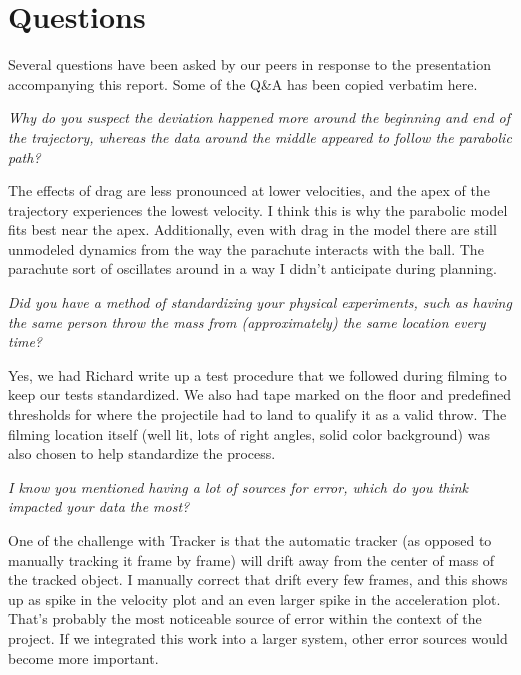 \section{Questions}

Several questions have been asked by our peers in response to the presentation accompanying this report. Some of the Q\&A has been copied verbatim here.

\medskip 

\textit{Why do you suspect the deviation happened more around the beginning and end of the trajectory, whereas the data around the middle appeared to follow the parabolic path?}

\smallskip

The effects of drag are less pronounced at lower velocities, and the apex of the trajectory experiences the lowest velocity. I think this is why the parabolic model fits best near the apex. Additionally, even with drag in the model there are still unmodeled dynamics from the way the parachute interacts with the ball. The parachute sort of oscillates around in a way I didn't anticipate during planning. 

\medskip 

\textit{Did you have a method of standardizing your physical experiments, such as having the same person throw the mass from (approximately) the same location every time?}

\smallskip

Yes, we had Richard write up a test procedure that we followed during filming to keep our tests standardized. We also had tape marked on the floor and predefined thresholds for where the projectile had to land to qualify it as a valid throw. The filming location itself (well lit, lots of right angles, solid color background) was also chosen to help standardize the process.


\medskip 

\textit{I know you mentioned having a lot of sources for error, which do you think impacted your data the most?}

\smallskip

One of the challenge with Tracker is that the automatic tracker (as opposed to manually tracking it frame by frame) will drift away from the center of mass of the tracked object. I manually correct that drift every few frames, and this shows up as spike in the velocity plot and an even larger spike in the acceleration plot. That's probably the most noticeable source of error within the context of the project. If we integrated this work into a larger system, other error sources would become more important.

